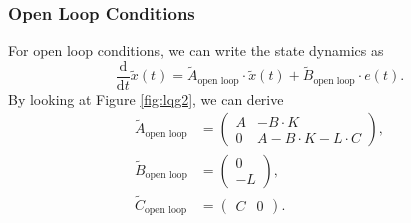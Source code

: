 \documentclass[a4paper,12 pt]{article}
\numberwithin{equation}{section}
\theoremstyle{definition}
\theoremstyle{remark}
\theoremstyle{definition}
\theoremstyle{definition}
\theoremstyle{definition}
\theoremstyle{remark}
\begin{document}
\subsubsection*{Open Loop Conditions}
For open loop conditions, we can write the state dynamics as
\begin{equation}
\frac{\text{d}}{\text{d}t}\tilde{x}(t)=\tilde{A}_{\text{open loop}}\cdot \tilde{x}(t)+\tilde{B}_{\text{open loop}}\cdot e(t).
\end{equation}
By looking at Figure \ref{fig:lqg2}, we can derive
\begin{equation}
\begin{split}
\tilde{A}_{\text{open loop}}&=\begin{pmatrix}
A&-B\cdot K\\
0&A-B\cdot K -L\cdot C
\end{pmatrix},\\
\tilde{B}_{\text{open loop}}&=\begin{pmatrix}
0\\
-L
\end{pmatrix},\\
\tilde{C}_{\text{open loop}}&=\begin{pmatrix}
C&0
\end{pmatrix}.
\end{split}
\end{equation}
\end{document}
